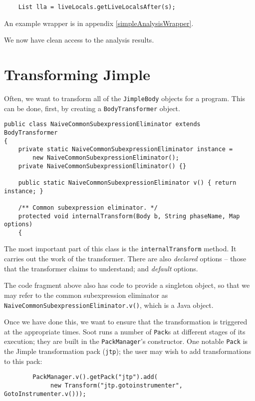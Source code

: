 \documentclass{article}
\begin{document}
\begin{verbatim}
    List lla = liveLocals.getLiveLocalsAfter(s);
\end{verbatim}

An example wrapper is in appendix \ref{simpleAnalysisWrapper}.

We now have clean access to the analysis results.

\section{Transforming Jimple}

Often, we want to transform all of the {\tt JimpleBody} objects for a
program.  This can be done, first, by creating a {\tt BodyTransformer}
object.

\begin{verbatim}
public class NaiveCommonSubexpressionEliminator extends BodyTransformer
{ 
    private static NaiveCommonSubexpressionEliminator instance = 
        new NaiveCommonSubexpressionEliminator();
    private NaiveCommonSubexpressionEliminator() {}

    public static NaiveCommonSubexpressionEliminator v() { return instance; }

    /** Common subexpression eliminator. */
    protected void internalTransform(Body b, String phaseName, Map options)
    {
\end{verbatim}

The most important part of this class is the {\tt internalTransform}
method.  It carries out the work of the transformer.  There are also
{\em declared} options -- those that the transformer claims to understand;
and {\em default} options.

The code fragment above also has code to provide a singleton object,
so that we may refer to the common subexpression eliminator as
{\tt NaiveCommonSubexpressionEliminator.v()}, which is a Java object.

Once we have done this, we want to ensure that the transformation
is triggered at the appropriate times.  Soot runs a number of {\tt Pack}s 
at different stages of its execution; they are built in the {\tt PackManager}'s
constructor.  One notable {\tt Pack} is the Jimple transformation pack
({\tt jtp}); the user may wish to add transformations to this pack:

\begin{verbatim}
        PackManager.v().getPack("jtp").add(
             new Transform("jtp.gotoinstrumenter", GotoInstrumenter.v()));
\end{verbatim}
\end{document}
